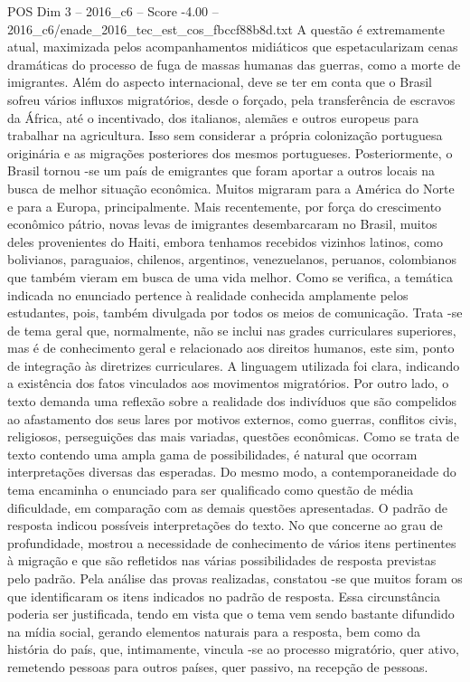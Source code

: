 \begin{textsample}{POS Dim 3 – 2016\_c6 – Score -4.00 – 2016\_c6/enade\_2016\_tec\_est\_cos\_fbccf88b8d.txt}
A questão é extremamente atual, maximizada pelos acompanhamentos midiáticos que espetacularizam cenas dramáticas do processo de fuga de massas humanas das guerras, como a morte de imigrantes.
Além do aspecto internacional, deve se ter em conta que o Brasil sofreu vários influxos migratórios, desde o forçado, pela transferência de escravos da África, até o incentivado, dos italianos, alemães e outros europeus para trabalhar na agricultura.
Isso sem considerar a própria colonização portuguesa originária e as migrações posteriores dos mesmos portugueses.
Posteriormente, o Brasil tornou -se um país de emigrantes que foram aportar a outros locais na busca de melhor situação econômica.
Muitos migraram para a América do Norte e para a Europa, principalmente.
Mais recentemente, por força do crescimento econômico pátrio, novas levas de imigrantes desembarcaram no Brasil, muitos deles provenientes do Haiti, embora tenhamos recebidos vizinhos latinos, como bolivianos, paraguaios, chilenos, argentinos, venezuelanos, peruanos, colombianos que também vieram em busca de uma vida melhor.
Como se verifica, a temática indicada no enunciado pertence à realidade conhecida amplamente pelos estudantes, pois, também divulgada por todos os meios de comunicação.
Trata -se de tema geral que, normalmente, não se inclui nas grades curriculares superiores, mas é de conhecimento geral e relacionado aos direitos humanos, este sim, ponto de integração às diretrizes curriculares.
A linguagem utilizada foi clara, indicando a existência dos fatos vinculados aos movimentos migratórios.
Por outro lado, o texto demanda uma reflexão sobre a realidade dos indivíduos que são compelidos ao afastamento dos seus lares por motivos externos, como guerras, conflitos civis, religiosos, perseguições das mais variadas, questões econômicas.
Como se trata de texto contendo uma ampla gama de possibilidades, é natural que ocorram interpretações diversas das esperadas.
Do mesmo modo, a contemporaneidade do tema encaminha o enunciado para ser qualificado como questão de média dificuldade, em comparação com as demais questões apresentadas.
O padrão de resposta indicou possíveis interpretações do texto.
No que concerne ao grau de profundidade, mostrou a necessidade de conhecimento de vários itens pertinentes à migração e que são refletidos nas várias possibilidades de resposta previstas pelo padrão.
Pela análise das provas realizadas, constatou -se que muitos foram os que identificaram os itens indicados no padrão de resposta.
Essa circunstância poderia ser justificada, tendo em vista que o tema vem sendo bastante difundido na mídia social, gerando elementos naturais para a resposta, bem como da história do país, que, intimamente, vincula -se ao processo migratório, quer ativo, remetendo pessoas para outros países, quer passivo, na recepção de pessoas.

\end{textsample}
